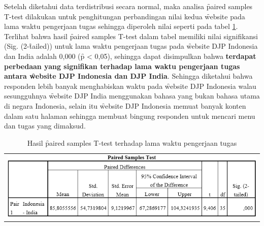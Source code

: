 \noindent
Setelah diketahui data terdistribusi secara normal, maka analisa \f{paired samples T-test} dilakukan untuk penghitungan perbandingan nilai kedua \f{website} pada lama waktu pengerjaan tugas sehingga diperoleh nilai seperti pada tabel \ref{tab:ttestwaktu}. Terlihat bahwa hasil \f{paired samples T-test} dalam tabel memiliki nilai signifikansi (Sig. (2-\f{tailed})) untuk lama waktu pengerjaan tugas pada \f{website} DJP Indonesia dan India adalah 0,000 (\f{p} < 0,05), sehingga dapat disimpulkan bahwa \textbf{terdapat perbedaan yang signifikan terhadap lama waktu pengerjaan tugas antara \f{website} DJP Indonesia dan DJP India}. Sehingga diketahui bahwa responden lebih banyak menghabiskan waktu pada \f{website} DJP Indonesia walau sesungguhnya \f{website} DJP India menggunakan bahasa yang bukan bahasa utama di negara Indonesia, selain itu \f{website} DJP Indonesia memuat banyak konten dalam satu halaman sehingga membuat bingung responden untuk mencari menu dan tugas yang dimaksud.
\begin{table}
	\centering
	\caption{Hasil \f{paired samples T-test} terhadap lama waktu pengerjaan tugas}
	\label{tab:ttestwaktu}
	\begin{tabular}{c}
		\includegraphics[width=\textwidth]
		{pics/waktuSelesaiT-test.PNG}
	\end{tabular}
\end{table}
